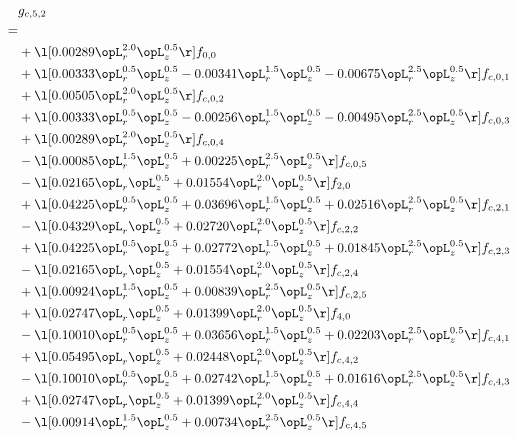 \begin{alignat}{2} 
\label{eq:g_52_0} 
& g_{c,5,2} \nonumber \\ 
 = \\ 
& + \l[  0.00289 \opL_r^{2.0} \opL_z^{0.5}  \r] f_{0,0} \nonumber \\ 
& + \l[  0.00333 \opL_r^{0.5} \opL_z^{0.5}   -0.00341 \opL_r^{1.5} \opL_z^{0.5}   -0.00675 \opL_r^{2.5} \opL_z^{0.5}  \r] f_{c,0,1} \nonumber \\ 
& + \l[  0.00505 \opL_r^{2.0} \opL_z^{0.5}  \r] f_{c,0,2} \nonumber \\ 
& + \l[  0.00333 \opL_r^{0.5} \opL_z^{0.5}   -0.00256 \opL_r^{1.5} \opL_z^{0.5}   -0.00495 \opL_r^{2.5} \opL_z^{0.5}  \r] f_{c,0,3} \nonumber \\ 
& + \l[  0.00289 \opL_r^{2.0} \opL_z^{0.5}  \r] f_{c,0,4} \nonumber \\ 
& - \l[  0.00085 \opL_r^{1.5} \opL_z^{0.5} +  0.00225 \opL_r^{2.5} \opL_z^{0.5}  \r] f_{c,0,5} \nonumber \\ 
& - \l[  0.02165 \opL_r \opL_z^{0.5} +  0.01554 \opL_r^{2.0} \opL_z^{0.5}  \r] f_{2,0} \nonumber \\ 
& + \l[  0.04225 \opL_r^{0.5} \opL_z^{0.5} +  0.03696 \opL_r^{1.5} \opL_z^{0.5} +  0.02516 \opL_r^{2.5} \opL_z^{0.5}  \r] f_{c,2,1} \nonumber \\ 
& - \l[  0.04329 \opL_r \opL_z^{0.5} +  0.02720 \opL_r^{2.0} \opL_z^{0.5}  \r] f_{c,2,2} \nonumber \\ 
& + \l[  0.04225 \opL_r^{0.5} \opL_z^{0.5} +  0.02772 \opL_r^{1.5} \opL_z^{0.5} +  0.01845 \opL_r^{2.5} \opL_z^{0.5}  \r] f_{c,2,3} \nonumber \\ 
& - \l[  0.02165 \opL_r \opL_z^{0.5} +  0.01554 \opL_r^{2.0} \opL_z^{0.5}  \r] f_{c,2,4} \nonumber \\ 
& + \l[  0.00924 \opL_r^{1.5} \opL_z^{0.5} +  0.00839 \opL_r^{2.5} \opL_z^{0.5}  \r] f_{c,2,5} \nonumber \\ 
& + \l[  0.02747 \opL_r \opL_z^{0.5} +  0.01399 \opL_r^{2.0} \opL_z^{0.5}  \r] f_{4,0} \nonumber \\ 
& - \l[  0.10010 \opL_r^{0.5} \opL_z^{0.5} +  0.03656 \opL_r^{1.5} \opL_z^{0.5} +  0.02203 \opL_r^{2.5} \opL_z^{0.5}  \r] f_{c,4,1} \nonumber \\ 
& + \l[  0.05495 \opL_r \opL_z^{0.5} +  0.02448 \opL_r^{2.0} \opL_z^{0.5}  \r] f_{c,4,2} \nonumber \\ 
& - \l[  0.10010 \opL_r^{0.5} \opL_z^{0.5} +  0.02742 \opL_r^{1.5} \opL_z^{0.5} +  0.01616 \opL_r^{2.5} \opL_z^{0.5}  \r] f_{c,4,3} \nonumber \\ 
& + \l[  0.02747 \opL_r \opL_z^{0.5} +  0.01399 \opL_r^{2.0} \opL_z^{0.5}  \r] f_{c,4,4} \nonumber \\ 
& - \l[  0.00914 \opL_r^{1.5} \opL_z^{0.5} +  0.00734 \opL_r^{2.5} \opL_z^{0.5}  \r] f_{c,4,5} \nonumber \\ 
\end{alignat} 



